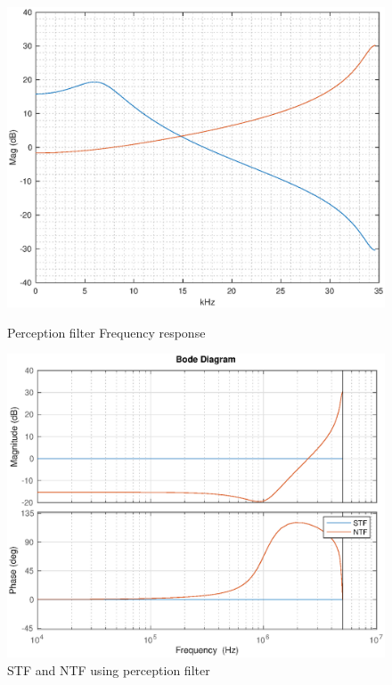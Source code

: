 \documentclass[a4paper]{article}
\begin{document}
\begin{figure}[!h]
	\centering
\begin{minipage}{0.45\linewidth}
	\centering
	\includegraphics[scale = 0.45]{plots/percp.eps}
        \caption{Perception filter Frequency response}
	\end{minipage}
	\hfil
	\begin{minipage}{0.45\linewidth}
	\centering
	\includegraphics[scale = 0.45]{plots/stf_ntf_perception_linear.eps}
		\caption{STF and NTF using perception filter}
\end{minipage}
\end{figure}
\end{document}
